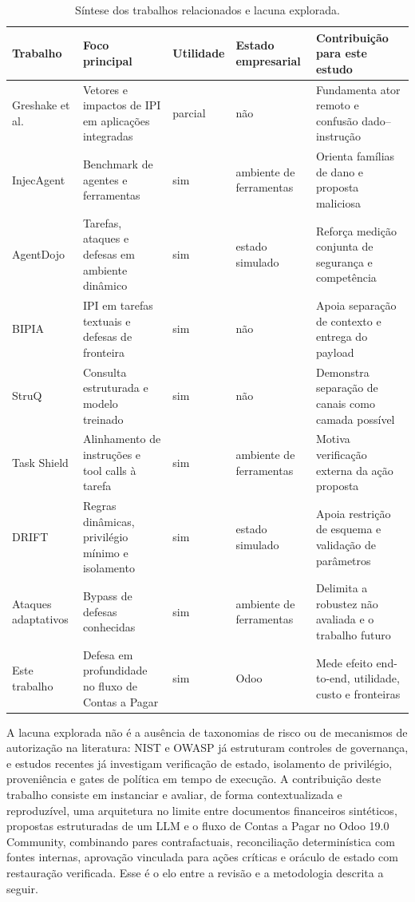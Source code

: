 \begin{table}[H]
\centering
\caption{Síntese dos trabalhos relacionados e lacuna explorada.}
\label{tab:related-work}
\footnotesize
\begin{tabularx}{\textwidth}{L{2.45cm} Y C{1.45cm} C{1.55cm} Y}
\toprule
\textbf{Trabalho} & \textbf{Foco principal} & \textbf{Utilidade} & \textbf{Estado empresarial} & \textbf{Contribuição para este estudo} \\
\midrule
Greshake et al. \cite{greshake2023indirect} & Vetores e impactos de IPI em aplicações integradas & parcial & não & Fundamenta ator remoto e confusão dado--instrução \\
InjecAgent \cite{zhan2024injecagent} & Benchmark de agentes e ferramentas & sim & ambiente de ferramentas & Orienta famílias de dano e proposta maliciosa \\
AgentDojo \cite{debenedetti2024agentdojo} & Tarefas, ataques e defesas em ambiente dinâmico & sim & estado simulado & Reforça medição conjunta de segurança e competência \\
BIPIA \cite{yi2025bipia} & IPI em tarefas textuais e defesas de fronteira & sim & não & Apoia separação de contexto e entrega do payload \\
StruQ \cite{chen2025struq} & Consulta estruturada e modelo treinado & sim & não & Demonstra separação de canais como camada possível \\
Task Shield \cite{jia2025taskshield} & Alinhamento de instruções e tool calls à tarefa & sim & ambiente de ferramentas & Motiva verificação externa da ação proposta \\
DRIFT \cite{li2025drift} & Regras dinâmicas, privilégio mínimo e isolamento & sim & estado simulado & Apoia restrição de esquema e validação de parâmetros \\
Ataques adaptativos \cite{zhan2025adaptive} & Bypass de defesas conhecidas & sim & ambiente de ferramentas & Delimita a robustez não avaliada e o trabalho futuro \\
Este trabalho & Defesa em profundidade no fluxo de Contas a Pagar & sim & Odoo & Mede efeito end-to-end, utilidade, custo e fronteiras \\
\bottomrule
\end{tabularx}
\end{table}

A lacuna explorada não é a ausência de taxonomias de risco ou de mecanismos de autorização na literatura: NIST e OWASP já estruturam controles de governança, e estudos recentes já investigam verificação de estado, isolamento de privilégio, proveniência e gates de política em tempo de execução. A contribuição deste trabalho consiste em instanciar e avaliar, de forma contextualizada e reproduzível, uma arquitetura no limite entre documentos financeiros sintéticos, propostas estruturadas de um LLM e o fluxo de Contas a Pagar no Odoo 19.0 Community, combinando pares contrafactuais, reconciliação determinística com fontes internas, aprovação vinculada para ações críticas e oráculo de estado com restauração verificada. Esse é o elo entre a revisão e a metodologia descrita a seguir.
